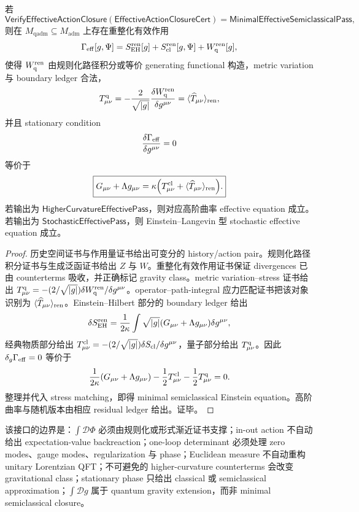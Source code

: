 \begin{theorem}[有效作用半经典闭包的可靠性]\label{thm:typed-address-biaxial-completion-effective-action-semiclassical-closure-soundness}
若
\[
\mathsf{VerifyEffectiveActionClosure}
(\mathsf{EffectiveActionClosureCert})
=
\mathsf{MinimalEffectiveSemiclassicalPass},
\]
则在 \(M_{\mathrm{qadm}}\subseteq M_{\mathrm{adm}}\) 上存在重整化有效作用
\[
\Gamma_{\rm eff}[g,\Psi]
=
S_{\rm EH}^{\rm ren}[g]
+
S_{\rm cl}^{\rm ren}[g,\Psi]
+
W_{\rm q}^{\rm ren}[g],
\]
使得 \(W_{\rm q}^{\rm ren}\) 由规则化路径积分或等价 generating functional 构造，metric variation 与 boundary ledger 合法，
\[
T_{\mu\nu}^{\rm q}
=
-\frac{2}{\sqrt{|g|}}
\frac{\delta W_{\rm q}^{\rm ren}}{\delta g^{\mu\nu}}
=
\langle\widehat T_{\mu\nu}\rangle_{\rm ren},
\]
并且 stationary condition
\[
\frac{\delta\Gamma_{\rm eff}}{\delta g^{\mu\nu}}=0
\]
等价于
\[
\boxed{
G_{\mu\nu}
+
\Lambda g_{\mu\nu}
=
\kappa
\Bigl(
T_{\mu\nu}^{\rm cl}
+
\langle\widehat T_{\mu\nu}\rangle_{\rm ren}
\Bigr).
}
\]
若输出为 \(\mathsf{HigherCurvatureEffectivePass}\)，则对应高阶曲率 effective equation 成立。若输出为 \(\mathsf{StochasticEffectivePass}\)，则 Einstein--Langevin 型 stochastic effective equation 成立。
\end{theorem}
\begin{proof}
历史空间证书与作用量证书给出可变分的 history/action pair。规则化路径积分证书与生成泛函证书给出 \(Z\) 与 \(W\)。重整化有效作用证书保证 divergences 已由 counterterms 吸收，并正确标记 gravity class。metric variation--stress 证书给出 \(T_{\mu\nu}^{\rm q}=-(2/\sqrt{|g|})\delta W_{\rm q}^{\rm ren}/\delta g^{\mu\nu}\)。operator--path-integral 应力匹配证书把该对象识别为 \(\langle\widehat T_{\mu\nu}\rangle_{\rm ren}\)。Einstein--Hilbert 部分的 boundary ledger 给出
\[
\delta S_{\rm EH}^{\rm ren}
=
\frac{1}{2\kappa}
\int\sqrt{|g|}
(G_{\mu\nu}+\Lambda g_{\mu\nu})
\delta g^{\mu\nu},
\]
经典物质部分给出 \(T_{\mu\nu}^{\rm cl}=-(2/\sqrt{|g|})\delta S_{\rm cl}/\delta g^{\mu\nu}\)，量子部分给出 \(T_{\mu\nu}^{\rm q}\)。因此 \(\delta_g\Gamma_{\rm eff}=0\) 等价于
\[
\frac{1}{2\kappa}
(G_{\mu\nu}+\Lambda g_{\mu\nu})
-
\frac12T_{\mu\nu}^{\rm cl}
-
\frac12T_{\mu\nu}^{\rm q}
=0.
\]
整理并代入 stress matching，即得 minimal semiclassical Einstein equation。高阶曲率与随机版本由相应 residual ledger 给出。证毕。
\end{proof}

该接口的边界是：\(\int\mathcal D\Phi\) 必须由规则化或形式渐近证书支撑；in-out action 不自动给出 expectation-value backreaction；one-loop determinant 必须处理 zero modes、gauge modes、regularization 与 phase；Euclidean measure 不自动重构 unitary Lorentzian QFT；不可避免的 higher-curvature counterterms 会改变 gravitational class；stationary phase 只给出 classical 或 semiclassical approximation；\(\int\mathcal Dg\) 属于 quantum gravity extension，而非 minimal semiclassical closure。
